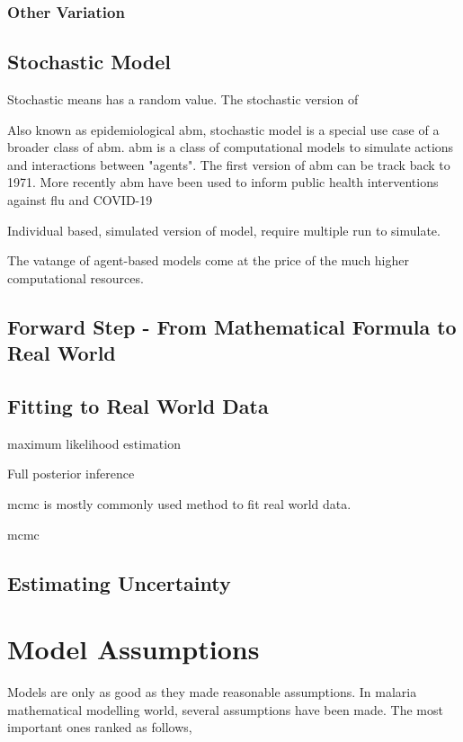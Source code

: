 \documentclass[a4paper, 12pt, twoside]{article}
\begin{document}
\subsubsection{Other Variation}

\subsection{Stochastic Model}

Stochastic means has a random value. The stochastic version of 

Also known as epidemiological \gls{abm}, stochastic model is a special use case of a broader class of \gls{abm}. \gls{abm} is a class of computational models to simulate actions and interactions between "agents". The first version of \gls{abm} can be track back to 1971\cite{Schelling1971}. More recently \gls{abm} have been used to inform public health interventions against flu\cite{Ferguson2006a, Ferguson2005} and COVID-19\cite{Maziarz2020, Ferguson2020, Chang2020}

Individual based, simulated version of model, require multiple run to simulate.

The vatange of agent-based models come at the price of the much higher computational resources.

\subsection{Forward Step - From Mathematical Formula to Real World}

\subsection{Fitting to Real World Data}

maximum likelihood estimation

Full posterior inference

\gls{mcmc} is mostly commonly used method to fit real world data.

\gls{mcmc}

\subsection{Estimating Uncertainty}

\section{Model Assumptions}
Models are only as good as they made reasonable assumptions. In malaria mathematical modelling world, several assumptions have been made. The most important ones ranked as follows,
\end{document}
